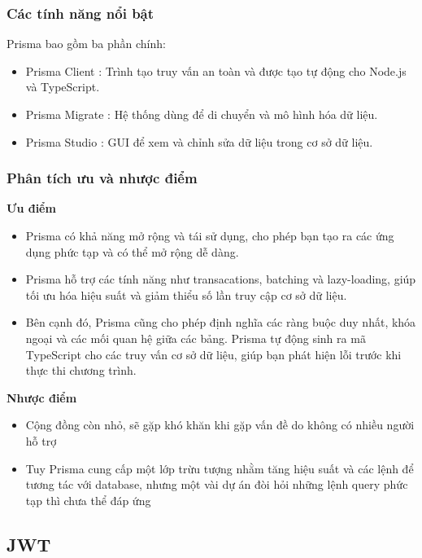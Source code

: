 \subsubsection{Các tính năng nổi bật}
Prisma bao gồm ba phần chính:
\begin{itemize}
    \item Prisma Client : Trình tạo truy vấn an toàn và được tạo tự động cho Node.js và TypeScript.
    \item Prisma Migrate : Hệ thống dùng để di chuyển và mô hình hóa dữ liệu.
    \item Prisma Studio : GUI để xem và chỉnh sửa dữ liệu trong cơ sở dữ liệu.
\end{itemize}
\subsubsection{Phân tích ưu và nhược điểm}
\textbf{Ưu điểm}
\begin{itemize}
    \item Prisma có khả năng mở rộng và tái sử dụng, cho phép bạn tạo ra các ứng dụng phức tạp và có thể mở rộng dễ dàng. 
    \item Prisma hỗ trợ các tính năng như transacations, batching và lazy-loading, giúp tối ưu hóa hiệu suất và giảm thiểu số lần truy cập cơ sở dữ liệu.
    \item Bên cạnh đó, Prisma cũng cho phép định nghĩa các ràng buộc duy nhất, khóa ngoại và các mối quan hệ giữa các bảng. Prisma tự động sinh ra mã TypeScript cho các truy vấn cơ sở dữ liệu, giúp bạn phát hiện lỗi trước khi thực thi chương trình.
\end{itemize}
\textbf{Nhược điểm}
\begin{itemize}
    \item Cộng đồng còn nhỏ, sẽ gặp khó khăn khi gặp vấn đề do không có nhiều người hỗ trợ
    \item Tuy Prisma cung cấp một lớp trừu tượng nhằm tăng hiệu suất và các lệnh để tương tác với database, nhưng một vài dự án đòi hỏi những lệnh query phức tạp thì chưa thể đáp ứng
\end{itemize}
\subsection{JWT}
